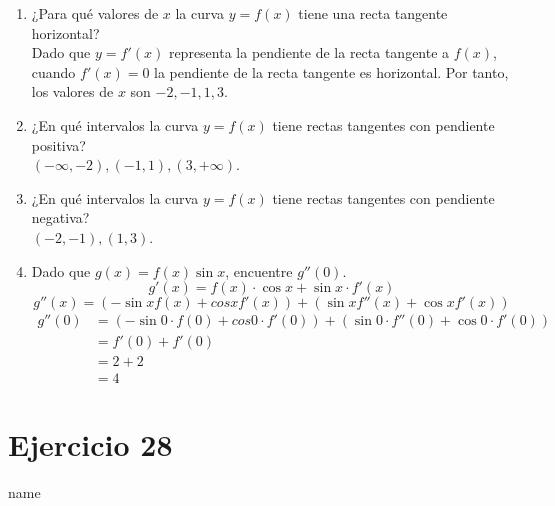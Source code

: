 \documentclass[12pt]{article}
\begin{document}
\begin{enumerate}[label=(\alph*)]
\item ¿Para qué valores de $x$ la curva $y = f(x)$ tiene una recta tangente horizontal?\\
  Dado que $y=f'(x)$ representa la pendiente de la recta tangente a $f(x)$, cuando $f'(x)=0$ la pendiente de la recta tangente es horizontal. Por tanto, los valores de $x$ son $-2,-1,1,3$.

\item ¿En qué intervalos la curva $y = f(x)$ tiene rectas tangentes con pendiente positiva?\\
  $(-\infty,-2),(-1,1),(3,+\infty)$.

\item ¿En qué intervalos la curva $y = f(x)$ tiene rectas tangentes con pendiente negativa?\\
  $(-2,-1), (1,3)$.

\item Dado que $g(x) = f(x) \sin x$, encuentre $g''(0)$.
  $$g'(x)=f(x)\cdot \cos x + \sin x \cdot f'(x)$$
  $$g''(x)=(-\sin xf(x) + cosxf'(x)) + (\sin xf''(x)+\cos xf'(x))$$
  \begin{equation*}
    \begin{split}
      g''(0)
      &= (-\sin 0 \cdot f(0) + cos0\cdot f'(0)) + (\sin 0\cdot f''(0)+\cos 0\cdot f'(0))\\
      &= f'(0) + f'(0) \\
      &= 2+2\\
      &=4
    \end{split}
  \end{equation*}
  
\end{enumerate}

\section{Ejercicio 28} name \\
\end{document}
